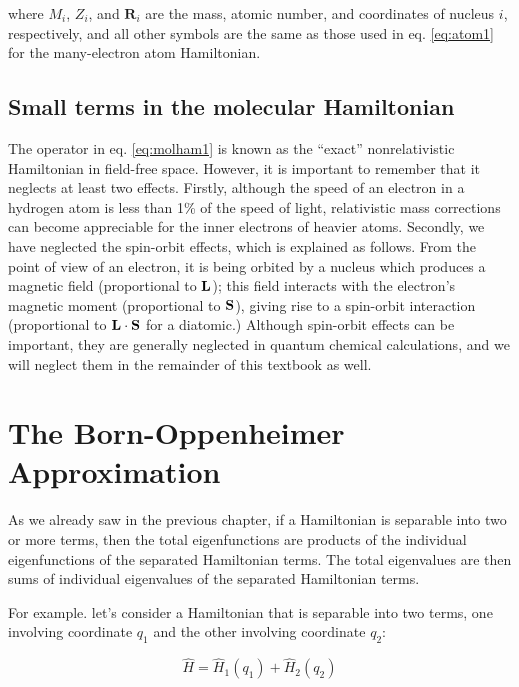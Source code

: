 \documentclass[
  9pt,
]{extbook}
\theoremstyle{definition}
\theoremstyle{definition}
\theoremstyle{definition}
\theoremstyle{remark}
\begin{document}
where \(M_i\), \(Z_i\), and \(\mathbf{R}_i\) are the mass, atomic number, and coordinates of nucleus \(i\), respectively, and all other symbols are the same as those used in eq. \eqref{eq:atom1} for the many-electron atom Hamiltonian.

\hypertarget{small-terms-in-the-molecular-hamiltonian}{%
\subsection{Small terms in the molecular Hamiltonian}\label{small-terms-in-the-molecular-hamiltonian}}

The operator in eq. \eqref{eq:molham1} is known as the ``exact'' nonrelativistic Hamiltonian in field-free space. However, it is important to remember that it neglects at least two effects. Firstly, although the speed of an electron in a hydrogen atom is less than 1\% of the speed of light, relativistic mass corrections can become appreciable for the inner electrons of heavier atoms. Secondly, we have neglected the spin-orbit effects, which is explained as follows. From the point of view of an electron, it is being orbited by a nucleus which produces a magnetic field (proportional to \({\bf L}\)); this field interacts with the electron's magnetic moment (proportional to \({\bf S}\)), giving rise to a spin-orbit interaction (proportional to \({\bf L} \cdot {\bf S}\) for a diatomic.) Although spin-orbit effects can be important, they are generally neglected in quantum chemical calculations, and we will neglect them in the remainder of this textbook as well.

\hypertarget{the-born-oppenheimer-approximation}{%
\section{The Born-Oppenheimer Approximation}\label{the-born-oppenheimer-approximation}}

As we already saw in the previous chapter, if a Hamiltonian is separable into two or more terms, then the total eigenfunctions are products of the individual eigenfunctions of the separated Hamiltonian terms. The total eigenvalues are then sums of individual eigenvalues of the separated Hamiltonian terms.

For example. let's consider a Hamiltonian that is separable into two terms, one involving coordinate \(q_1\) and the other involving coordinate \(q_2\):

\begin{equation}
\hat{H} = \hat{H}_1(q_1) + \hat{H}_2(q_2)
\label{eq:molham3}
\end{equation}
\end{document}
